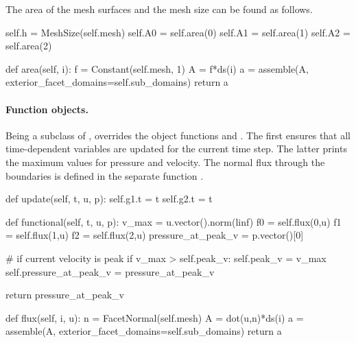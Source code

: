 The area of the mesh surfaces and the mesh size can be found as follows.
\begin{python}
	self.h = MeshSize(self.mesh)
	self.A0 = self.area(0)
	self.A1 = self.area(1)
	self.A2 = self.area(2)

def area(self, i):
	f = Constant(self.mesh, 1)
	A = f*ds(i)
	a = assemble(A, exterior_facet_domains=self.sub_domains)
	return a
\end{python}

\paragraph{Function objects.}
Being a subclass of ,  overrides the object
functions  and . The first ensures that all
time-dependent variables are updated for the current time step. The latter
prints the maximum values for pressure and velocity. The normal flux
through the boundaries is defined in the separate function .
\begin{python}
def update(self, t, u, p):
	self.g1.t = t
	self.g2.t = t

def functional(self, t, u, p):
	v_max = u.vector().norm(linf)
	f0 = self.flux(0,u)
	f1 = self.flux(1,u)
	f2 = self.flux(2,u)
	pressure_at_peak_v = p.vector()[0]

	# if current velocity is peak
	if v_max > self.peak_v:
		self.peak_v = v_max
		self.pressure_at_peak_v = pressure_at_peak_v

	return pressure_at_peak_v

def flux(self, i, u):
	n = FacetNormal(self.mesh)
	A = dot(u,n)*ds(i)
	a = assemble(A, exterior_facet_domains=self.sub_domains)
	return a
\end{python}

